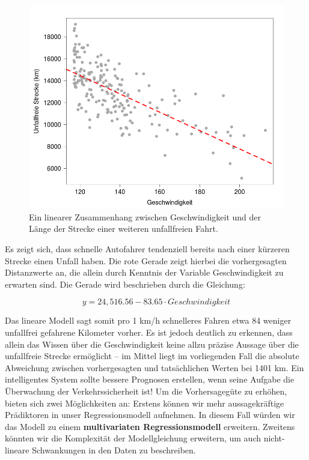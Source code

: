 \begin{figure}[!ht]
  \caption{Ein linearer Zusammenhang zwischen Geschwindigkeit und der Länge der
    Strecke einer weiteren unfallfreien Fahrt.}  \centering
  \includegraphics[width=1\textwidth]{chapters/svm/plot_lds.png}
\end{figure}

Es zeigt sich, dass schnelle Autofahrer tendenziell bereits nach einer kürzeren
Strecke einen Unfall haben. Die rote Gerade zeigt hierbei die vorhergesagten
Distanzwerte an, die allein durch Kenntnis der Variable Geschwindigkeit zu erwarten
sind. Die Gerade wird beschrieben durch die Gleichung:

\begin{equation*}
y = 24,516.56 - 83.65 \cdot Geschwindigkeit
\end{equation*}

Das lineare Modell sagt somit pro 1 km/h schnelleres Fahren etwa 84 weniger
unfallfrei gefahrene Kilometer vorher. Es ist jedoch deutlich zu erkennen, dass
allein das Wissen über die Geschwindigkeit keine allzu präzise Aussage über die
unfallfreie Strecke ermöglicht -- im Mittel liegt im vorliegenden Fall die absolute
Abweichung zwischen vorhergesagten und tatsächlichen Werten bei 1401 km. Ein
intelligentes System sollte bessere Prognosen erstellen, wenn seine Aufgabe die
Überwachung der Verkehrssicherheit ist! Um die Vorhersagegüte zu erhöhen, bieten sich
zwei Möglichkeiten an: Erstens können wir mehr aussagekräftige Prädiktoren in unser
Regressionsmodell aufnehmen. In diesem Fall würden wir das Modell zu einem
\textbf{multivariaten Regressionsmodell} erweitern. Zweitens könnten wir die
Komplexität der Modellgleichung erweitern, um auch nicht-lineare Schwankungen in den
Daten zu beschreiben.

